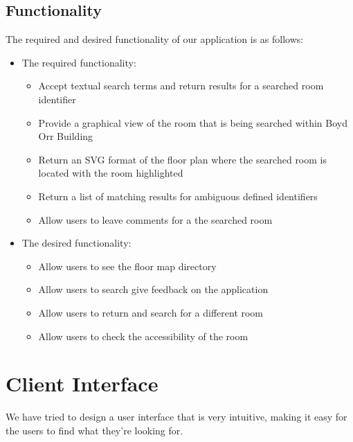 \documentclass{sig-alt-release2}
\begin{document}
\subsection{Functionality}
The required and desired functionality of our application is as follows:
\begin{itemize}
	\item The required functionality:
	\begin{itemize}
		\item Accept textual search terms and return results for a searched
		room identifier 
		
		\item Provide a graphical view of the room that is being searched
		within Boyd Orr Building
		
		\item Return an SVG format of the floor plan where the searched
		room is located with the room highlighted
		
		\item Return a list of matching results for ambiguous defined
		identifiers
		
		\item Allow users to leave comments for a the searched room		
	\end{itemize}

	\item The desired functionality:
	\begin{itemize}
		\item Allow users to see the floor map directory
		\item Allow users to search give feedback on the application
		\item Allow users to return and search for a different room
		\item Allow users to check the accessibility of the room
	\end{itemize}
\end{itemize}

\section{Client Interface}

We have tried to design a user interface that is very intuitive, making it
easy for the users to find what they're looking for.
\end{document}

